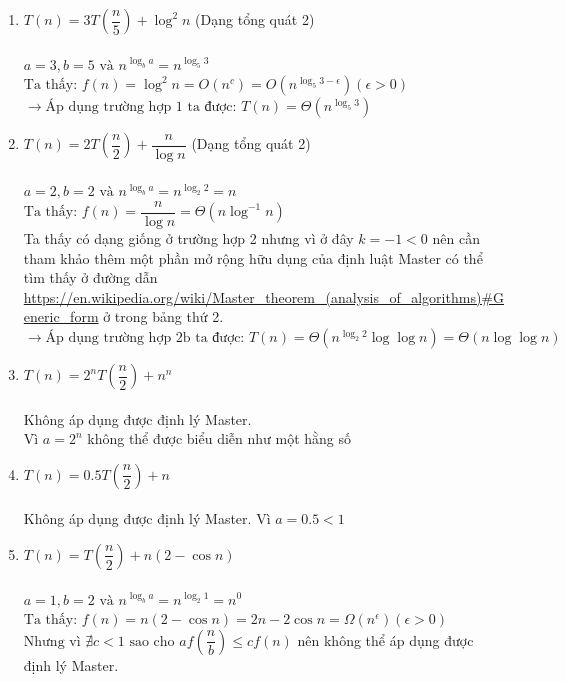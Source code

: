 \documentclass[12pt, letterpaper]{article}
\begin{document}
\begin{enumerate}[label=\bfseries\large\theenumi.]
    \item $ T(n) = 3T\left( \dfrac{n}{5} \right) + \log^2 n $ (Dạng tổng quát 2) \\ \\
        $ a = 3, b = 5 \text{ và } n^{\log_b a} = n^{\log_5 3} $ \\
        $ \text{Ta thấy: } f(n) = \log^2 n = O(n^c) = O(n^{\log_5 3 - \epsilon}) (\epsilon > 0) $ \\
        $ \rightarrow \text{Áp dụng trường hợp 1 ta được: } T(n) = \Theta(n^{\log_5 3}) $

    \item $ T(n) = 2T\left( \dfrac{n}{2} \right) + \dfrac{n}{\log n} $ (Dạng tổng quát 2) \\ \\
        $ a = 2, b = 2 \text{ và } n^{\log_b a} = n^{\log_2 2} = n $ \\
        $ \text{Ta thấy: } f(n) = \dfrac{n}{\log n} = \Theta(n \log^{-1} n) $ \\
        Ta thấy có dạng giống ở trường hợp 2 nhưng vì ở đây $ k = -1 < 0 $ nên cần tham khảo thêm
        một phần mở rộng hữu dụng của định luật Master có thể tìm thấy ở đường dẫn
        \url{https://en.wikipedia.org/wiki/Master_theorem_(analysis_of_algorithms)#Generic_form}
        ở trong bảng thứ 2. \\
        $ \rightarrow \text{Áp dụng trường hợp 2b ta được: } T(n) = \Theta(n^{\log_2 2} \log\log n) = \Theta(n\log\log n) $

    \item $ T(n) = 2^n T\left( \dfrac{n}{2} \right) + n^n $ \\ \\
        Không áp dụng được định lý Master. \\
        Vì $ a = 2^n $ không thể được biểu diễn như một hằng số \\

    \item $ T(n) = 0.5 T\left( \dfrac{n}{2} \right) + n $ \\ \\
        Không áp dụng được định lý Master. Vì $ a = 0.5 < 1 $ \\

    \item $ T(n) = T\left( \dfrac{n}{2} \right) + n(2 - \cos n) $ \\ \\
        $ a = 1, b = 2 \text{ và } n^{\log_b a} = n^{\log_2 1} = n^0 $ \\
        $ \text{Ta thấy: } f(n) = n (2 - \cos n) = 2n - 2 \cos n = \Omega(n^\epsilon) (\epsilon > 0) $ \\
        $ \text{Nhưng vì } \nexists c < 1 \text{ sao cho } af\left(\dfrac{n}{b}\right) \leq cf(n) $
        nên không thể áp dụng được định lý Master.


\end{enumerate}
\end{document}
